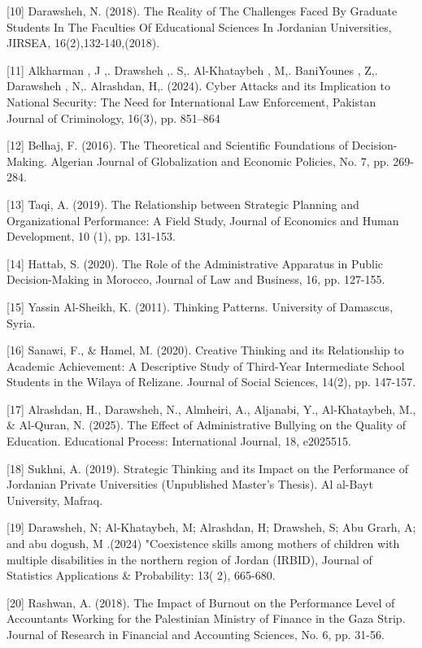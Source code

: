 \documentclass[10pt]{NSP1}
\begin{document}
[10] Darawsheh, N. (2018). The Reality of The Challenges Faced By Graduate Students In The Faculties Of Educational Sciences In Jordanian Universities, JIRSEA, 16(2),132-140,(2018).

[11] Alkharman , J ,. Drawsheh ,. S,. Al-Khataybeh , M,. BaniYounes , Z,. Darawsheh , N,. Alrashdan, H,. (2024). Cyber Attacks and its Implication to National Security: The Need for International Law Enforcement, Pakistan Journal of Criminology, 16(3), pp. 851–864

[12] Belhaj, F. (2016). The Theoretical and Scientific Foundations of Decision-Making. Algerian Journal of Globalization and Economic Policies, No. 7, pp. 269-284.

[13] Taqi, A. (2019). The Relationship between Strategic Planning and Organizational Performance: A Field Study, Journal of Economics and Human Development, 10 (1), pp. 131-153.

[14] Hattab, S. (2020). The Role of the Administrative Apparatus in Public Decision-Making in Morocco, Journal of Law and Business, 16, pp. 127-155.

[15] Yassin Al-Sheikh, K. (2011). Thinking Patterns. University of Damascus, Syria.

[16] Sanawi, F., \& Hamel, M. (2020). Creative Thinking and its Relationship to Academic Achievement: A Descriptive Study of Third-Year Intermediate School Students in the Wilaya of Relizane. Journal of Social Sciences, 14(2), pp. 147-157.

[17] Alrashdan, H., Darawsheh, N., Almheiri, A., Aljanabi, Y., Al-Khataybeh, M., \& Al-Quran, N. (2025). The Effect of Administrative Bullying on the Quality of Education. Educational Process: International Journal, 18, e2025515.

[18] Sukhni, A. (2019). Strategic Thinking and its Impact on the Performance of Jordanian Private Universities (Unpublished Master's Thesis). Al al-Bayt University, Mafraq.

[19] Darawsheh, N; Al-Khataybeh, M; Alrashdan, H; Drawsheh, S; Abu Grarh, A; and abu dogush, M .(2024) "Coexistence skills among mothers of children with multiple disabilities in the northern region of Jordan (IRBID), Journal of Statistics Applications \& Probability: 13( 2), 665-680.

[20] Rashwan, A. (2018). The Impact of Burnout on the Performance Level of Accountants Working for the Palestinian Ministry of Finance in the Gaza Strip. Journal of Research in Financial and Accounting Sciences, No. 6, pp. 31-56.
\end{document}
